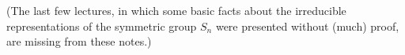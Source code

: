 \begin{example}
\end{example}




(The last few lectures, in which some basic facts about the irreducible representations of the symmetric group $S_n$ were presented without (much) proof, are missing from these notes.)




